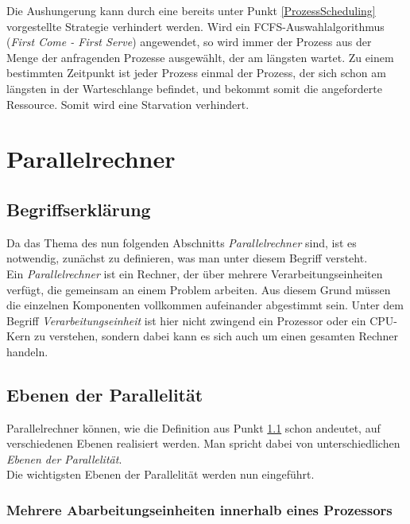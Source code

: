 				Die Aushungerung kann durch eine bereits unter Punkt \ref{ProzessScheduling} vorgestellte Strategie verhindert werden. Wird ein FCFS-Auswahlalgorithmus (\textit{First Come - First Serve}) angewendet, so wird immer der Prozess aus der Menge der anfragenden Prozesse ausgewählt, der am längsten wartet. Zu einem bestimmten Zeitpunkt ist jeder Prozess einmal der Prozess, der sich schon am längsten in der Warteschlange befindet, und bekommt somit die angeforderte Ressource. Somit wird eine Starvation verhindert. \cite{ModerneBetriebssysteme}
				
	\section{Parallelrechner}
		
		\subsection{Begriffserklärung}
			\label{ParallelrechnerBegriffserklaerung}
			
			Da das Thema des nun folgenden Abschnitts \textit{Parallelrechner} sind, ist es notwendig, zunächst zu definieren, was man unter diesem Begriff versteht.\\
			Ein \textit{Parallelrechner} ist ein Rechner, der über mehrere Verarbeitungseinheiten verfügt, die gemeinsam an einem Problem arbeiten. Aus diesem Grund müssen die einzelnen Komponenten vollkommen aufeinander abgestimmt sein. Unter dem Begriff \textit{Verarbeitungseinheit} ist hier nicht zwingend ein Prozessor oder ein CPU-Kern zu verstehen, sondern dabei kann es sich auch um einen gesamten Rechner handeln. \cite{ParallelrechnerAmirnaderi}
			
		\subsection{Ebenen der Parallelität}
			\label{EbenenParallelitaet}
		
			Parallelrechner können, wie die Definition aus Punkt \ref{ParallelrechnerBegriffserklaerung} schon andeutet, auf verschiedenen Ebenen realisiert werden. Man spricht dabei von unterschiedlichen \textit{Ebenen der Parallelität}.\\
			Die wichtigsten Ebenen der Parallelität werden nun eingeführt. \cite{GrundlagenParallelisierungKegel}
			
			\subsubsection{Mehrere Abarbeitungseinheiten innerhalb eines Prozessors}
				\label{MehrereAbarbeitungseinheitenProzessor}
				
